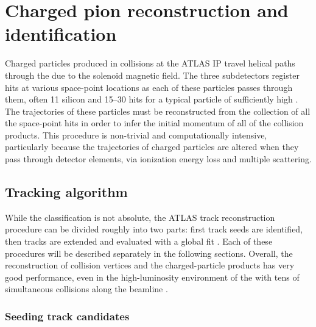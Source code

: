 \chapter{Charged pion reconstruction and identification}
\label{ch:reconstruction}
\graphicspath{{Chapter-Reconstruction/figures/}}

Charged particles produced in collisions at the ATLAS \ac{IP} travel helical paths through the \id due to the solenoid magnetic field.
The three subdetectors register hits at various space-point locations as each of these particles passes through them, often 11 silicon and 15--30 \trt hits for a typical particle of sufficiently high \pt.
The trajectories of these particles must be reconstructed from the collection of all the space-point hits in order to infer the initial momentum of all of the collision products.
This procedure is non-trivial and computationally intensive, particularly because the trajectories of charged particles are altered when they pass through detector elements, via ionization energy loss and multiple scattering.

\section{Tracking algorithm}



While the classification is not absolute, the ATLAS track reconstruction procedure can be divided roughly into two parts: first track seeds are identified, then tracks are extended and evaluated with a global fit \cite{Cornelissen:2007vba}. %
Each of these procedures will be described separately in the following sections.
Overall, the reconstruction of collision vertices and the charged-particle products has very good performance, even in the high-luminosity environment of the \lhc with tens of simultaneous collisions along the beamline \cite{ATLAS:2012jma}. %

\subsection{Seeding track candidates}

